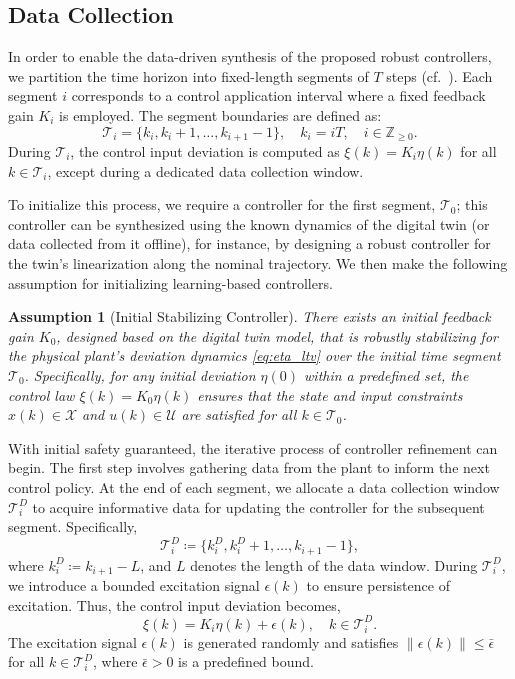 \documentclass[letterpaper, 10 pt, conference]{ieeeconf}
\newtheorem{assumption}{Assumption}
\begin{document}
\subsection{Data Collection}
\label{subsec:data_collection}

In order to enable the data-driven synthesis of the proposed robust controllers, we partition the time horizon into fixed-length segments of $T$ steps (cf.~\cite{Liu_2023}). Each segment $i$ corresponds to a control application interval where a fixed feedback gain $K_i$ is employed. The segment boundaries are defined as:
\begin{equation}
    \mathcal{T}_i = \{k_i, k_i+1, \dots, k_{i+1}-1\}, \quad k_i = iT, \quad i \in \mathbb{Z}_{\ge 0}.
\end{equation}
During $\mathcal{T}_i$, the control input deviation is computed as $\xi(k) = K_i \eta(k)$ for all $k \in \mathcal{T}_i$, except during a dedicated data collection window.

To initialize this process, we require a controller for the first segment, $\mathcal{T}_0$; this controller can be synthesized using the known dynamics of the digital twin (or data collected from it offline), for instance, by designing a robust controller for the twin's linearization along the nominal trajectory. We then make the following assumption for initializing learning-based controllers.
\begin{assumption}[Initial Stabilizing Controller]\label{ass:initial_controller}
There exists an initial feedback gain $K_0$, designed based on the digital twin model, that is robustly stabilizing for the physical plant's deviation dynamics \eqref{eq:eta_ltv} over the initial time segment $\mathcal{T}_0$. Specifically, for any initial deviation $\eta(0)$ within a predefined set, the control law $\xi(k)= K_0 \eta(k)$ ensures that the state and input constraints $x(k)\in \mathcal{X}$ and $u(k)\in \mathcal{U}$ are satisfied for all $k \in \mathcal{T}_0$.
\end{assumption}

With initial safety guaranteed, the iterative process of controller refinement can begin. The first step involves gathering data from the plant to inform the next control policy.
At the end of each segment, we allocate a data collection window $\mathcal{T}_i^D$ to acquire informative data for updating the controller for the subsequent segment. Specifically,
\begin{equation}\label{eq:data_window}
    \mathcal{T}_i^D \coloneqq \{ k_i^D, k_i^D+1, \dots, k_{i+1}-1 \},
\end{equation}
where $k_i^D \coloneqq k_{i+1} - L$, and $L$ denotes the length of the data window. During $\mathcal{T}_i^D$, we introduce a bounded excitation signal $\epsilon(k)$ to ensure persistence of excitation. Thus, the control input deviation becomes,
\begin{equation}
    \xi(k) = K_i \eta(k) + \epsilon(k), \quad k \in \mathcal{T}_i^D.
\end{equation}
The excitation signal $\epsilon(k)$ is generated randomly and satisfies $\|\epsilon(k)\| \leq \bar{\epsilon}$ for all $k \in \mathcal{T}_i^D$, where $\bar{\epsilon} > 0$ is a predefined bound.
\end{document}
